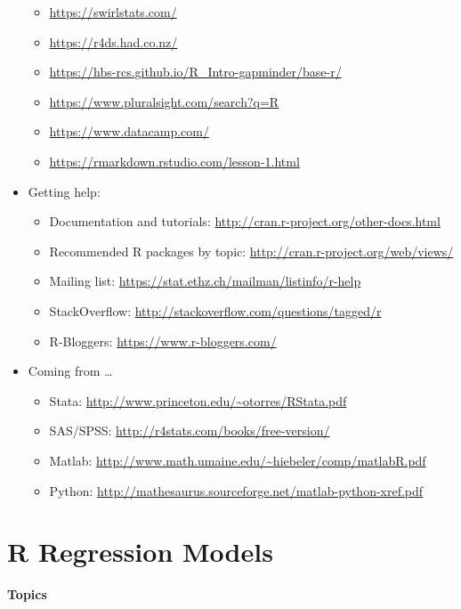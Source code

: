 \documentclass[
]{book}
\providecommand{\tightlist}{%
  \setlength{\itemsep}{0pt}\setlength{\parskip}{0pt}}
\begin{document}
\begin{itemize}
  \begin{itemize}
  \tightlist
  \item
    \url{https://swirlstats.com/}
  \item
    \url{https://r4ds.had.co.nz/}
  \item
    \url{https://hbs-rcs.github.io/R_Intro-gapminder/base-r/}
  \item
    \url{https://www.pluralsight.com/search?q=R}
  \item
    \url{https://www.datacamp.com/}
  \item
    \url{https://rmarkdown.rstudio.com/lesson-1.html}
  \end{itemize}
\item
  Getting help:

  \begin{itemize}
  \tightlist
  \item
    Documentation and tutorials: \url{http://cran.r-project.org/other-docs.html}
  \item
    Recommended R packages by topic: \url{http://cran.r-project.org/web/views/}
  \item
    Mailing list: \url{https://stat.ethz.ch/mailman/listinfo/r-help}
  \item
    StackOverflow: \url{http://stackoverflow.com/questions/tagged/r}
  \item
    R-Bloggers: \url{https://www.r-bloggers.com/}
  \end{itemize}
\item
  Coming from \ldots{}

  \begin{itemize}
  \tightlist
  \item
    Stata: \url{http://www.princeton.edu/~otorres/RStata.pdf}
  \item
    SAS/SPSS: \url{http://r4stats.com/books/free-version/}
  \item
    Matlab: \url{http://www.math.umaine.edu/~hiebeler/comp/matlabR.pdf}
  \item
    Python: \url{http://mathesaurus.sourceforge.net/matlab-python-xref.pdf}
  \end{itemize}
\end{itemize}

\hypertarget{r-regression-models}{%
\chapter{R Regression Models}\label{r-regression-models}}

\textbf{Topics}
\end{document}
